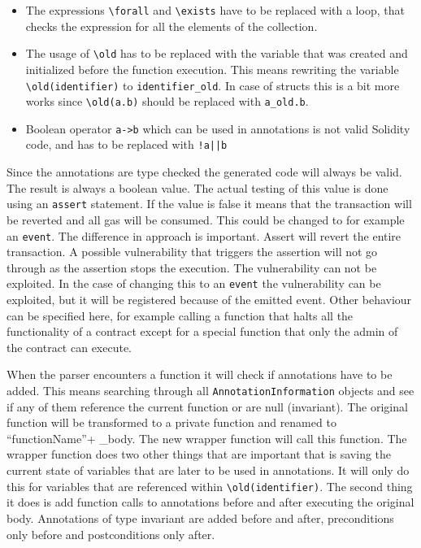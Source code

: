 \documentclass[a4paper]{article}
\begin{document}
\begin{itemize}
  \item The expressions \texttt{\textbackslash forall} and \texttt{\textbackslash exists} have to be replaced with a loop, that checks the expression for all the elements of the collection. 
  \item The usage of \texttt{\textbackslash old} has to be replaced with the variable that was created and initialized before the function execution. This means rewriting the variable \texttt{\textbackslash old(identifier)} to \texttt{identifier\_old}. In case of structs this is a bit more works since \texttt{\textbackslash old(a.b)} should be replaced with \texttt{a\_old.b}.
  \item Boolean operator \texttt{a->b} which can be used in annotations is not valid Solidity code, and has to be replaced with \texttt{!a||b}
\end{itemize}
Since the annotations are type checked the generated code will always be valid. The result is always a boolean value. The actual testing of this value is done using an \texttt{assert} statement. If the value is false it means that the transaction will be reverted and all gas will be consumed. This could be changed to for example an \texttt{event}. The difference in approach is important. Assert will revert the entire transaction. A possible vulnerability that triggers the assertion will not go through as the assertion stops the execution. The vulnerability can not be exploited. In the case of changing this to an \texttt{event} the vulnerability can be exploited, but it will be registered because of the emitted event. Other behaviour can be specified here, for example calling a function that halts all the functionality of a contract except for a special function that only the admin of the contract can execute.\par
When the parser encounters a function it will check if annotations have to be added. This means searching through all \texttt{AnnotationInformation} objects and see if any of them reference the current function or are null (invariant). The original function will be transformed to a private function and renamed to ``functionName''+ \_body. The new wrapper function will call this function. The wrapper function does two other things that are important that is saving the current state of variables that are later to be used in annotations. It will only do this for variables that are referenced within \texttt{\textbackslash old(identifier)}. The second thing it does is add function calls to annotations before and after executing the original body. Annotations of type invariant are added before and after, preconditions only before and postconditions only after. \par
\end{document}
